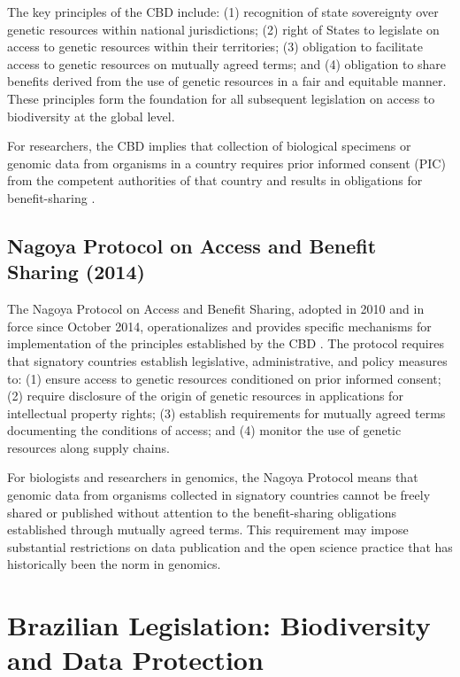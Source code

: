 The key principles of the CBD include: (1) recognition of state sovereignty over genetic resources within national jurisdictions; (2) right of States to legislate on access to genetic resources within their territories; (3) obligation to facilitate access to genetic resources on mutually agreed terms; and (4) obligation to share benefits derived from the use of genetic resources in a fair and equitable manner. These principles form the foundation for all subsequent legislation on access to biodiversity at the global level.

For researchers, the CBD implies that collection of biological specimens or genomic data from organisms in a country requires prior informed consent (PIC) from the competent authorities of that country and results in obligations for benefit-sharing \parencite{cbd1992}.

\subsection{Nagoya Protocol on Access and Benefit Sharing (2014)}

The Nagoya Protocol on Access and Benefit Sharing, adopted in 2010 and in force since October 2014, operationalizes and provides specific mechanisms for implementation of the principles established by the CBD \parencite{nagoyaprotocol2014}. The protocol requires that signatory countries establish legislative, administrative, and policy measures to: (1) ensure access to genetic resources conditioned on prior informed consent; (2) require disclosure of the origin of genetic resources in applications for intellectual property rights; (3) establish requirements for mutually agreed terms documenting the conditions of access; and (4) monitor the use of genetic resources along supply chains.

For biologists and researchers in genomics, the Nagoya Protocol means that genomic data from organisms collected in signatory countries cannot be freely shared or published without attention to the benefit-sharing obligations established through mutually agreed terms. This requirement may impose substantial restrictions on data publication and the open science practice that has historically been the norm in genomics.

\section{Brazilian Legislation: Biodiversity and Data Protection}


